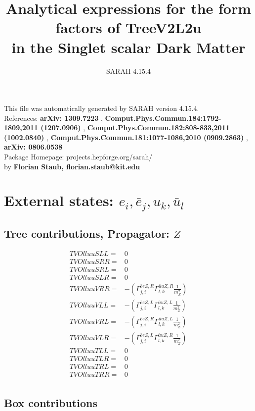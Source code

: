 \documentclass[A4,landscape]{article}
\begin{document}
\title{Analytical expressions for the form factors of TreeV2L2u\\ in the Singlet scalar Dark Matter } 
 \author{SARAH 4.15.4} 
 \maketitle 
 \vspace{10cm} 
This file was automatically generated by SARAH version 4.15.4.  \\ 
References: {\bf arXiv: 1309.7223 }, {\bf Comput.Phys.Commun.184:1792-1809,2011 (1207.0906) }, {\bf Comput.Phys.Commun.182:808-833,2011 (1002.0840) }, {\bf Comput.Phys.Commun.181:1077-1086,2010 (0909.2863) }, {\bf arXiv: 0806.0538 } \\ 
Package Homepage: projects.hepforge.org/sarah/ \\ 
by {\bf Florian Staub, florian.staub@kit.edu} 
 \pagebreak 
 \tableofcontents 
 \pagebreak 
\section{External states: ${e_{{i}}, \bar{e}_{{j}}, u_{{k}}, \bar{u}_{{l}}}$} 
\subsection{Tree contributions, Propagator: $Z$} 

\begin{align} 
  TVOlluuSLL= & 0 \\ 
  TVOlluuSRR= & 0 \\ 
  TVOlluuSRL= & 0 \\ 
  TVOlluuSLR= & 0 \\ 
  TVOlluuVRR= & -(\Gamma^{\bar{e}e Z ,R}_{j, i} \Gamma^{\bar{u}u Z ,R}_{l, k} \frac{1}{m^2_{Z}}) \\ 
  TVOlluuVLL= & -(\Gamma^{\bar{e}e Z ,L}_{j, i} \Gamma^{\bar{u}u Z ,L}_{l, k} \frac{1}{m^2_{Z}}) \\ 
  TVOlluuVRL= & -(\Gamma^{\bar{e}e Z ,R}_{j, i} \Gamma^{\bar{u}u Z ,L}_{l, k} \frac{1}{m^2_{Z}}) \\ 
  TVOlluuVLR= & -(\Gamma^{\bar{e}e Z ,L}_{j, i} \Gamma^{\bar{u}u Z ,R}_{l, k} \frac{1}{m^2_{Z}}) \\ 
  TVOlluuTLL= & 0 \\ 
  TVOlluuTLR= & 0 \\ 
  TVOlluuTRL= & 0 \\ 
  TVOlluuTRR= & 0 \\ 
\end{align} 
\subsection{Box contributions} 
\end{document}
